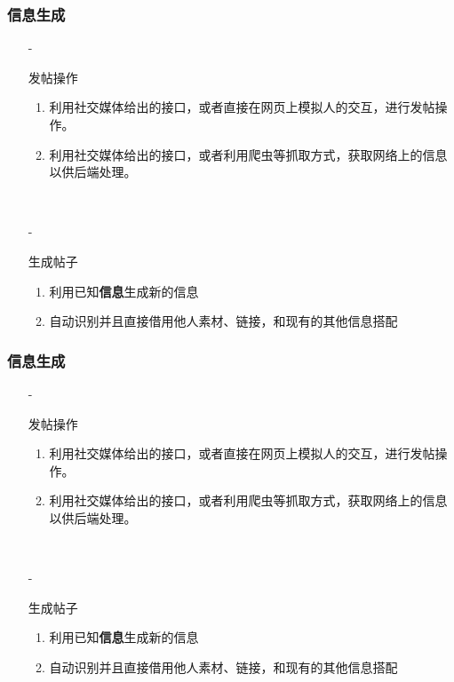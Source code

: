 \documentclass[10pt]{beamer}
\begin{document}
        \begin{frame}
            \frametitle{信息生成}
            \begin{itemize}
                \item[-]{
                    发帖操作
                    \begin{enumerate}
                        \item 利用社交媒体给出的接口，或者直接在网页上模拟人的交互，进行发帖操作。
                        \item 利用社交媒体给出的接口，或者利用爬虫等抓取方式，获取网络上的信息以供后端处理。
                    \end{enumerate}
                    \hspace*{\fill}\\
                    }
                \item[-]{
                    生成帖子
                    \begin{enumerate}
                        \item 利用已知\textbf{信息}生成新的信息
                        \item 自动识别并且直接借用他人素材、链接，和现有的其他信息搭配
                    \end{enumerate}
                    } 
            \end{itemize}
        \end{frame}

        \begin{frame}
            \frametitle{信息生成}
            \begin{itemize}
                \item[-]{
                    发帖操作
                    \begin{enumerate}
                        \item 利用社交媒体给出的接口，或者直接在网页上模拟人的交互，进行发帖操作。
                        \item 利用社交媒体给出的接口，或者利用爬虫等抓取方式，获取网络上的信息以供后端处理。
                    \end{enumerate}
                    \hspace*{\fill}\\
                    }
                \item[-]{
                    生成帖子
                    \begin{enumerate}
                        \item 利用已知\textbf{信息}生成新的信息
                        \item 自动识别并且直接借用他人素材、链接，和现有的其他信息搭配
                    \end{enumerate}
                    } 
            \end{itemize}
        \end{frame}
\end{document}
